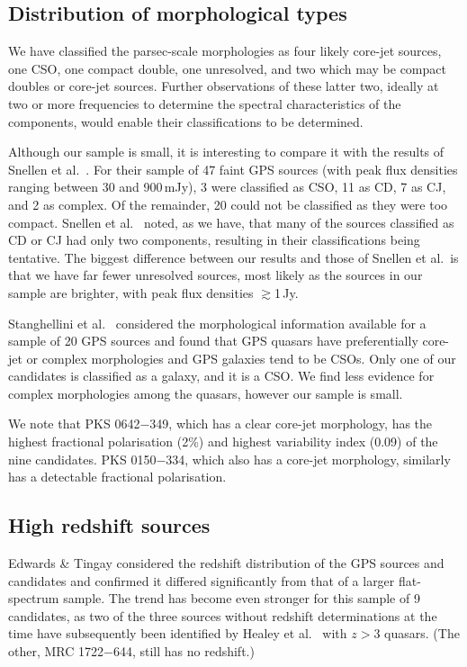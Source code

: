 \documentclass{pasa}%
\begin{document}
\subsection{Distribution of morphological types}


We have classified the parsec-scale morphologies as four likely
core-jet sources, one CSO, one compact double, one unresolved, and two
which may be compact doubles or core-jet sources.  Further
observations of these latter two, ideally at two or more frequencies
to determine the spectral characteristics of the components, would
enable their classifications to be determined.

Although our sample is small, it is interesting to compare it with the
results of Snellen et al.\ . For their sample of 47
faint GPS sources (with peak flux densities ranging between 30 and
900\,mJy), 3 were classified as CSO, 11 as CD, 7 as CJ, and 2 as
complex.  Of the remainder, 20 could not be classified as they were
too compact.  Snellen et al.\  noted, as we have,
that many of the sources classified as CD or CJ had only two
components, resulting in their classifications being tentative.  The
biggest difference between our results and those of Snellen et al.\ is
that we have far fewer unresolved sources, most likely as the sources
in our sample are brighter, with peak flux densities $\gtrsim$1\,Jy.

Stanghellini et al.\  considered the morphological
information available for a sample of 20 GPS sources and found that
GPS quasars have preferentially core-jet or complex morphologies and GPS
galaxies tend to be CSOs.  Only one of our candidates is classified as
a galaxy, and it is a CSO.  We find less evidence for complex
morphologies among the quasars, however our sample is small.

We note that PKS 0642$-$349, which has a clear core-jet morphology, has the
highest fractional polarisation (2\%) and highest variability index
(0.09) of the nine candidates. PKS 0150$-$334, which also has a
core-jet morphology, similarly has a detectable fractional polarisation.

\subsection{High redshift sources}

Edwards \& Tingay  considered the redshift
distribution of the GPS sources and candidates and confirmed it
differed significantly from that of a larger flat-spectrum sample. The
trend has become even stronger for this sample of 9 candidates, as two
of the three sources without redshift determinations at the time have
subsequently been identified by Healey et al.\  with
$z>$3 quasars.  (The other, MRC 1722$-$644, still has no
redshift.)
\end{document}
